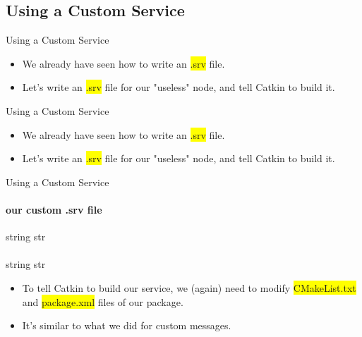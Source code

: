 \documentclass{beamer}
\begin{document}
\subsection{Using a Custom Service}

\begin{frame}{Using a Custom Service}
    \begin{itemize}
        \item We already have seen how to write an {\ttfamily \colorbox{yellow}{.srv}} file.
        
        \item Let's write an {\ttfamily \colorbox{yellow}{.srv}} file for our "useless" node, and tell Catkin to build it.
    \end{itemize}
\end{frame}

\begin{frame}{Using a Custom Service}
    \begin{itemize}
        \item We already have seen how to write an {\ttfamily \colorbox{yellow}{.srv}} file.

        \vspace{5mm}

        \item Let's write an {\ttfamily \colorbox{yellow}{.srv}} file for our "useless" node, and tell Catkin to build it.
    \end{itemize}
\end{frame}

\begin{frame}{Using a Custom Service}
    \framesubtitle{our custom .srv file}
    \begin{focus}
        \ttfamily
        string  \hspace{0.5cm} str\\
        \textemdash \textemdash \textemdash \\
        string  \hspace{0.5cm} str\\
    \end{focus} 
    \vspace{2mm}
    \begin{itemize}
        \item To tell Catkin to build our service, we (again) need to modify {\ttfamily \colorbox{yellow}{CMakeList.txt}} and {\ttfamily \colorbox{yellow}{package.xml}} files of our package.
        \vspace{2mm}
        \item It's similar to what we did for custom messages.
    \end{itemize}      
\end{frame}
\end{document}

